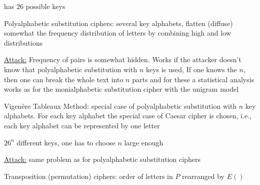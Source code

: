 \documentclass[landscape, a4paper]{article}
\begin{document}
\begin{minipage}[t]{0.2\linewidth}
\begin{betterlist}
\begin{betterlist}
\begin{betterlist}
\begin{betterlist}
\begin{betterlist}
\begin{betterlist}
							\item has $26$ possible keys
						\end{betterlist}
					\end{betterlist}
				\end{betterlist}
			\end{betterlist}
		\end{betterlist}
		\begin{betterlist}
			\item \alert{Polyalphabetic substitution ciphers:} several key alphabets, flatten (diffuse) somewhat the frequency distribution of letters by combining high and low distributions
			\begin{betterlist}
				\item \underline{Attack:} Frequency of pairs is somewhat hidden. Works if the attacker doesn't know that polyalphabetic substitution with $n$ keys is used, If one knows the $n$, then one can break the whole text into $n$ parts and for these a \alert{statistical analysis} works as for the monialphabetic substitution cipher with the unigram model
			\end{betterlist}
			\begin{betterlist}
				\item \alert{Vigenère Tableaux Method:} special case of polyalphabetic substitution with $n$ key alphabets. For each key alphabet the special case of Caesar cipher is chosen, i.e., each key alphabet can be represented by one letter%
				\begin{betterlist}
					\item $26^n$ different keys, one has to choose $n$ large enough
					\item \underline{Attack:} same problem as for polyalphabetic substitution ciphers
				\end{betterlist}
			\end{betterlist}
		\end{betterlist}
	\end{betterlist}
	\begin{betterlist}
		\item \alert{Transposition (permutation) ciphers:} order of letters in $P$ rearranged by $E()$
		\begin{betterlist}

\end{betterlist}
\end{betterlist}
\end{minipage}
\end{document}
